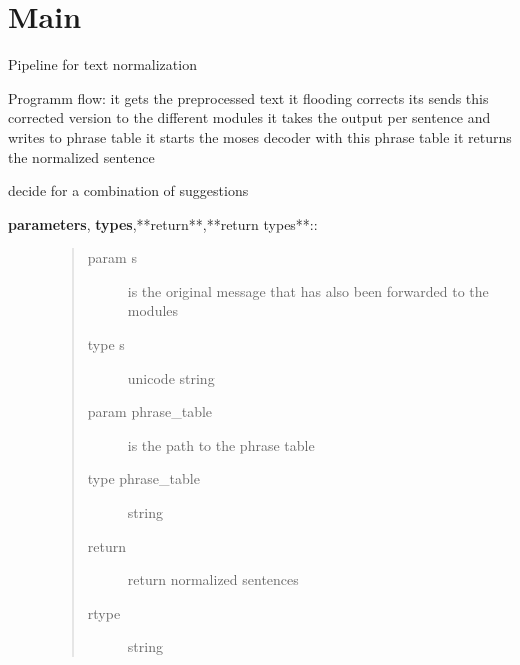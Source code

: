 \documentclass[letterpaper,10pt,english]{sphinxmanual}
\begin{document}
\section{Main}
\label{API:main}\label{API:module-norm.normalizer}

\begin{fulllineitems}
\label{API:norm.normalizer.Normalizer}
Pipeline for text normalization

Programm flow:
it gets the preprocessed text
it flooding corrects
its sends this corrected version to the
different modules
it takes the output per sentence and writes to phrase table
it starts the moses decoder with this phrase table
it returns the normalized sentence

\begin{fulllineitems}
\label{API:norm.normalizer.Normalizer._call_moses}
decide for a combination of suggestions
\begin{description}
\item[{\textbf{parameters}, \textbf{types},**return**,**return types**::}] \leavevmode\begin{quote}\begin{description}
\item[{param s}] \leavevmode
is the original message that has also been forwarded to the modules

\item[{type s}] \leavevmode
unicode string

\item[{param phrase\_table}] \leavevmode
is the path to the phrase table

\item[{type phrase\_table}] \leavevmode
string

\item[{return}] \leavevmode
return normalized sentences

\item[{rtype}] \leavevmode
string

\end{description}\end{quote}

\end{description}


\end{fulllineitems}
\end{fulllineitems}
\end{document}
